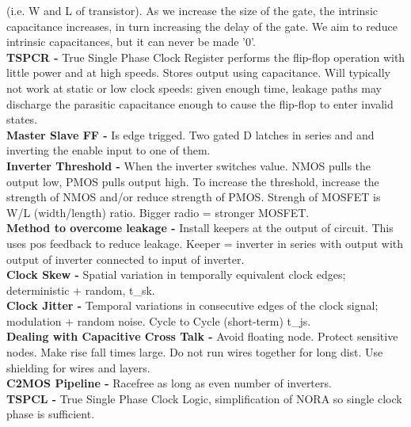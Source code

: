 \documentclass[9pt,fleqn]{article}
\begin{document}
\begin{multicols}{3}
    (i.e. W and L of transistor).  As we increase the size of the gate, the
    intrinsic capacitance increases, in turn increasing the delay of the gate.
    We aim to reduce intrinsic capacitances, but it can never be made '0'.\\
    \textbf{TSPCR -} True Single Phase Clock Register performs the flip-flop
    operation with little power and at high speeds. Stores output using
    capacitance. Will typically not work at static or low clock speeds: given
    enough time, leakage paths may discharge the parasitic capacitance enough
    to cause the flip-flop to enter invalid states.\\
    \textbf{Master Slave FF -} Is edge trigged. Two gated D latches in series
    and and inverting the enable input to one of them.\\
    \textbf{Inverter Threshold -} When the inverter switches value. NMOS pulls
    the output low, PMOS pulls output high. To increase the threshold,
    increase the strength of NMOS and/or reduce strength of PMOS. Strengh of
    MOSFET is W/L (width/length) ratio. Bigger radio = stronger MOSFET.\\
    \textbf{Method to overcome leakage -} Install keepers at the output of
    circuit. This uses pos feedback to reduce leakage. Keeper = inverter in
    series with output with output of inverter connected to input of inverter.\\
    \textbf{Clock Skew -} Spatial variation in temporally equivalent clock
    edges; deterministic + random, t\_sk. \\
    \textbf{Clock Jitter -} Temporal variations in consecutive edges of the
    clock signal; modulation + random noise. Cycle to Cycle (short-term) t\_js.\\
    \textbf{Dealing with Capacitive Cross Talk -} Avoid floating node. Protect
    sensitive nodes. Make rise fall times large. Do not run wires together for
    long dist. Use shielding for wires and layers. \\
    \textbf{C2MOS Pipeline -} Racefree as long as even number of inverters. \\
    \textbf{TSPCL -} True Single Phase Clock Logic, simplification of NORA so
    single clock phase is sufficient.\\



\end{multicols}
\end{document}
